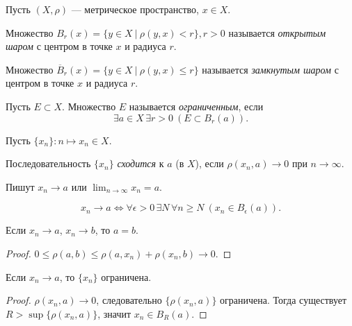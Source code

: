 \begin{definition}
    Пусть $(X, \rho)$ --- метрическое пространство, $x \in X$.

    Множество $B_r(x) = \{y \in X \ | \ \rho(y, x) < r\}, r > 0$ называется \emph{открытым шаром} с центром в точке $x$ и радиуса $r$.

    Множество $\overline{B}_r(x) = \{y \in X \ | \ \rho(y, x) \le r\}$ называется \emph{замкнутым шаром} с центром в точке $x$ и радиуса $r$.
\end{definition}

\begin{definition}
    Пусть $E \subset X$. Множество $E$ называется \emph{ограниченным}, если
    \[
        \exists a \in X \, \exists r > 0 \ (E \subset B_r(a)).
    \]
\end{definition}

\begin{definition}
    Пусть $\{x_n\} : n \mapsto x_n \in X$.

    Последовательность $\{x_n\}$ \emph{сходится} к $a$ (в $X$), если $\rho(x_n, a) \rightarrow 0$ при $n \rightarrow \infty$.

    Пишут $x_n \rightarrow a$ или $\lim_{n \rightarrow \infty} x_n = a$.
\end{definition}

\begin{note}
    \[
        x_n \rightarrow a \Leftrightarrow \forall \epsilon > 0 \, \exists N \, \forall n \ge N \ (x_{n} \in B_\epsilon(a)).
    \]
\end{note}

\begin{property}
    Если $x_n \rightarrow a$, $x_n \rightarrow b$, то $a = b$.
    \begin{proof}
        $0 \le \rho(a, b) \le \rho(a, x_n) + \rho(x_n, b) \rightarrow 0$.
    \end{proof}
\end{property}

\begin{property}
    Если $x_n \rightarrow a$, то $\{x_n\}$ ограничена.

    \begin{proof}
        $\rho(x_n, a) \rightarrow 0$, следовательно $\{\rho(x_n, a)\}$ ограничена. Тогда существует $R > \sup\{\rho(x_{n}, a)\}$, значит $x_n \in B_R(a)$.
    \end{proof}
\end{property}

